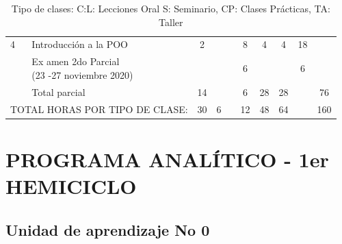 \documentclass[a4pa<per,12pt,spanish]{article}
\begin{document}
\begin{table}[H]
\begin{tabular}[H]{|p{0.5cm}|p{8cm}|c|c|c|c|c||c||c|c|}
        \multirow{-2}{*}{\cellcolor{yellow!20} \hfil \LARGE 4}         &  Introducción a la POO &2& & &8&4 &4 & 18 \\\cline{1-9}
  \rowcolor{gray!25}

                 &\makecell{Ex amen 2do Parcial\\ (23 -27 noviembre 2020)} & & & &6 &  & & 6 \\\hline
  \rowcolor{blue!10}

                    &Total parcial &14 & & &6 &28  &28 & &76 \\\hline

  \multicolumn{2}{|l|}{TOTAL HORAS POR TIPO DE CLASE:} &30&6 & &12  &48 &64 & &160 \\ \hline
  
\end{tabular}
\caption{Tipo de clases: C:\@Conferencia L: Lecciones Oral S: Seminario, CP: Clases Prácticas, TA: Taller}
\end{table}




\begingroup

\section{PROGRAMA ANALÍTICO - 1er HEMICICLO}
\subsection{Unidad de aprendizaje No 0}
\label{sec:unid-de-aprend0}
\end{document}
